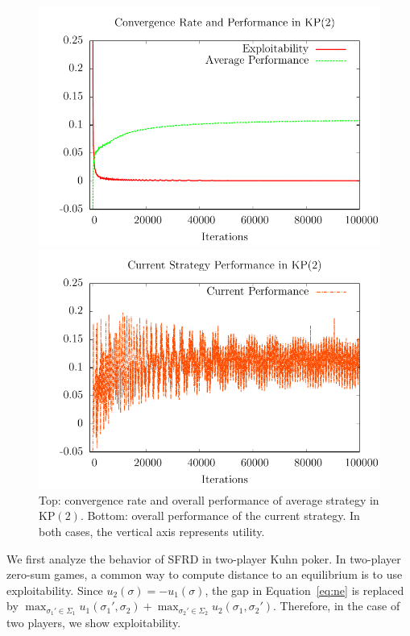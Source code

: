 \documentclass{aamas2014}
\begin{document}
\begin{figure}[t]
\begin{center}
\hspace{-0.5cm}\includegraphics[scale=0.7]{figs/sfrd2-conv} 

\hspace{-0.5cm}\includegraphics[scale=0.7]{figs/sfrd2-curperf}
\end{center}
\caption{Top: convergence rate and overall performance of average strategy in KP$(2)$. Bottom: overall performance
of the current strategy. In both cases, the vertical axis represents utility. \label{fig:sfrd2-conv}}
\end{figure}

We first analyze the behavior of SFRD in two-player Kuhn poker. 
In two-player zero-sum games, 
a common way to compute distance to an equilibrium is to use exploitability. Since $u_2(\sigma) = -u_1(\sigma)$, 
the gap in Equation~\ref{eq:ne} is replaced by 
$\max_{\sigma_1' \in \Sigma_1} u_1(\sigma_1', \sigma_2) + \max_{\sigma_2' \in \Sigma_2} u_2(\sigma_1, \sigma_2')$. 
Therefore, in the case of two players, we show exploitability. 
\end{document}
